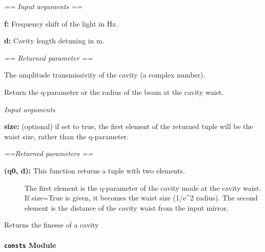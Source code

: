 \documentclass[letterpaper,10pt,english]{sphinxmanual}
\begin{document}
\begin{fulllineitems}
\begin{fulllineitems}
\emph{== Input arguments ==}

\textbf{f:} Frequency shift of the light in Hz.

\textbf{d:} Cavity length detuning in m.

\emph{== Returned parameter ==}

The amplitude transmissivity of the cavity (a complex number).

\end{fulllineitems}


\begin{fulllineitems}
\label{api/gtrace.optics:gtrace.optics.cavity.Cavity.waist}
Return the q-parameter or the radius of the beam at the cavity waist.

\emph{Input arguments}

\textbf{size:} (optional) if set to true, the first element of the returned tuple will be the waist size, rather than the q-parameter.

\emph{==Returned parameters ==}
\begin{description}
\item[{\textbf{(q0, d):}  This function returns a tuple with two elements.}] \leavevmode
The first element is the q-parameter of the cavity mode at
the cavity waist. If size=True is given, it becomes the waist
size (1/e\textasciicircum{}2 radius).
The second element is the distance of the cavity waist from
the input mirror.

\end{description}

\end{fulllineitems}


\end{fulllineitems}


\begin{fulllineitems}
\label{api/gtrace.optics:gtrace.optics.cavity.finesse}
Returns the finesse of a cavity

\end{fulllineitems}



\paragraph{\texttt{consts} Module}
\label{api/gtrace.optics:consts-module}\label{api/gtrace.optics:module-gtrace.optics.consts}
\end{document}
